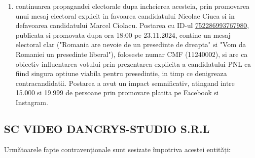 \documentclass[a4paper,12pt]{article}
\begin{document}
\begin{enumerate}[leftmargin=*, label=\arabic*.)]
    \item continuarea propagandei electorale dupa incheierea acesteia, prin promovarea unui mesaj electoral explicit in favoarea candidatului Nicolae Ciuca si in defavoarea candidatului Marcel Ciolacu. Postarea cu ID-ul \href{https://www.facebook.com/ads/library/?id=752286993767980}{752286993767980}, publicata si promovata dupa ora 18:00 pe 23.11.2024, contine un mesaj electoral clar ("Romania are nevoie de un presedinte de dreapta" si "Vom da Romaniei un presedinte liberal"), foloseste numar CMF (11240002), si are ca obiectiv influentarea votului prin prezentarea explicita a candidatului PNL ca fiind singura optiune viabila pentru presedintie, in timp ce denigreaza contracandidatii. Postarea a avut un impact semnificativ, atingand intre 15.000 si 19.999 de persoane prin promovare platita pe Facebook si Instagram.
\end{enumerate}

\vspace{0.5cm}

\subsection{SC VIDEO DANCRYS-STUDIO S.R.L}
Următoarele fapte contravenționale sunt sesizate împotriva acestei entități:
\end{document}
